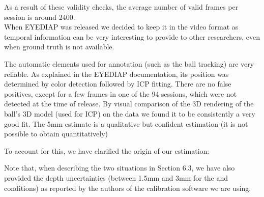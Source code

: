 {{As a result of these validity checks,  the average number of valid frames per session is around 2400.
}\\

When EYEDIAP was released we decided to keep it in the video format as temporal information can be very
interesting to provide to other researchers, even when ground truth is not available.

The automatic elements used for annotation (such as the ball tracking) are very reliable.
As explained in the EYEDIAP documentation, its position was determined by color detection followed by ICP fitting.
There are no false positives, except for a few frames in one of the 94 sessions, which were not detected
at the time of release. By visual comparison of the 3D rendering of the ball's 3D model (used for ICP) on the data we found it to be
consistently a very good fit. 
%
The 5mm estimate is a qualitative but confident estimation (it is not possible to obtain quantitatively)

To account for this, we have clarified the origin of our estimation:



Note that, when describing the two situations  in Section 6.3,  we have also provided  the depth uncertainties 
(between 1.5mm and 3mm for the \CS and \FT conditions) as reported by the authors of the calibration software we are using.


}




